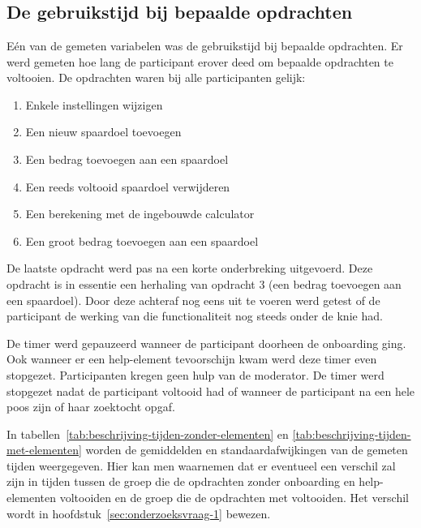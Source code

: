 \chapter{}
\label{ch:metingen}

\section{De gebruikstijd bij bepaalde opdrachten}
\label{sec:gebruikstijd}

Eén van de gemeten variabelen was de gebruikstijd bij bepaalde opdrachten. Er werd gemeten hoe lang de participant erover deed om bepaalde opdrachten te voltooien. De opdrachten waren bij alle participanten gelijk:
\begin{enumerate}
    \item Enkele instellingen wijzigen
    \item Een nieuw spaardoel toevoegen
    \item Een bedrag toevoegen aan een spaardoel
    \item Een reeds voltooid spaardoel verwijderen
    \item Een berekening met de ingebouwde calculator
    \item Een groot bedrag toevoegen aan een spaardoel
\end{enumerate}

De laatste opdracht werd pas na een korte onderbreking uitgevoerd. Deze opdracht is in essentie een herhaling van opdracht 3 (een bedrag toevoegen aan een spaardoel). Door deze achteraf nog eens uit te voeren werd getest of de participant de werking van die functionaliteit nog steeds onder de knie had.

De timer werd gepauzeerd wanneer de participant doorheen de onboarding ging. Ook wanneer er een help-element tevoorschijn kwam werd deze timer even stopgezet. Participanten kregen geen hulp van de moderator. De timer werd stopgezet nadat de participant voltooid had of wanneer de participant na een hele poos zijn of haar zoektocht opgaf.

In tabellen~\ref{tab:beschrijving-tijden-zonder-elementen} en \ref{tab:beschrijving-tijden-met-elementen} worden de gemiddelden en standaardafwijkingen van de gemeten tijden weergegeven. Hier kan men waarnemen dat er eventueel een verschil zal zijn in tijden tussen de groep die de opdrachten zonder onboarding en help-elementen voltooiden en de groep die de opdrachten met voltooiden. Het verschil wordt in hoofdstuk~\ref{sec:onderzoeksvraag-1} bewezen.

